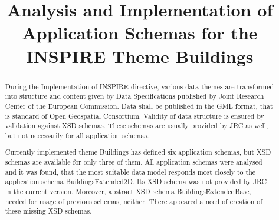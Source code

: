 \documentclass[eprint]{actapoly}
\begin{document}
\title[Implementation of the INSPIRE Theme Buildings]
{Analysis and Implementation of Application Schemas for the INSPIRE Theme Buildings}



\begin{abstract}
During the Implementation of INSPIRE directive, various data themes are transformed into structure and content given by Data Specifications published by Joint Research Center of the European Commission. Data shall be published in the GML format, that is standard of Open Geospatial Consortium. Validity of data structure is ensured by validation against XSD schemas. These schemas are usually provided by JRC as well, but not necessarily for all application schemas.

Currently implemented theme Buildings has defined six application schemas, but XSD schemas are available for only three of them. All application schemas were analysed and it was found, that the most suitable data model responds most closely to the application schema BuildingsExtended2D. Its XSD schema was not provided by JRC in the current version. Moreover, abstract XSD schema BuildingsExtendedBase, needed for usage of previous schemas, neither. There appeared a need of creation of these missing XSD schemas.

\end{abstract}


\maketitle
\end{document}

